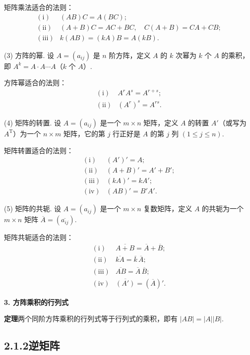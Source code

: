 \documentclass[UTF8, 12pt, fontset=fandol, oneside]{ctexart}
\begin{document}
矩阵乘法适合的法则：
\[
\begin{array}{ll}
\mathrm{(i)} & (AB)C=A(BC);\\
\mathrm{(ii)} & (A+B)C=AC+BC,\quad C(A+B)=CA+CB;\\
\mathrm{(iii)} & k(AB)=(kA)B=A(kB).
\end{array}
\]

(3) 方阵的幂. 设 $A=(a_{ij})$ 是 $n$ 阶方阵，定义 $A$ 的 $k$ 次幂为 $k$ 个 $A$ 的乘积，即 $A^k=A\cdot A\cdots A$（$k$ 个 $A$）.

方阵幂适合的法则：
\[
\begin{array}{ll}
\mathrm{(i)} & A^rA^s=A^{r+s};\\
\mathrm{(ii)} & (A^r)^s=A^{rs}.
\end{array}
\]

(4) 矩阵的转置. 设 $A=(a_{ij})$ 是一个 $m\times n$ 矩阵，定义 $A$ 的转置 $A'$（或写为 $A^{\mathrm T}$）为一个 $n\times m$ 矩阵，它的第 $j$ 行正好是 $A$ 的第 $j$ 列 $(1\le j\le n)$.

矩阵转置适合的法则：
\[
\begin{array}{ll}
\mathrm{(i)} & (A')'=A;\\
\mathrm{(ii)} & (A+B)'=A'+B';\\
\mathrm{(iii)} & (kA)'=kA';\\
\mathrm{(iv)} & (AB)'=B'A'.
\end{array}
\]

(5) 矩阵的共轭. 设 $A=(a_{ij})$ 是一个 $m\times n$ 复数矩阵，定义 $A$ 的共轭为一个 $m\times n$ 矩阵 $\overline A=(\overline{a_{ij}})$.

矩阵共轭适合的法则：
\[
\begin{array}{ll}
\mathrm{(i)} & \overline{A+B}=\overline A+\overline B;\\
\mathrm{(ii)} & \overline{kA}=\overline k\,\overline A;\\
\mathrm{(iii)} & \overline{AB}=\overline A\,\overline B;\\
\mathrm{(iv)} & \overline{(A')}=(\overline A)'.
\end{array}
\]

\noindent\textbf{3. 方阵乘积的行列式}

\noindent\textbf{定理}\quad 两个同阶方阵乘积的行列式等于行列式的乘积，即有 $|AB|=|A||B|$.

\subsection*{2.1.2\quad 逆矩阵}
\end{document}
